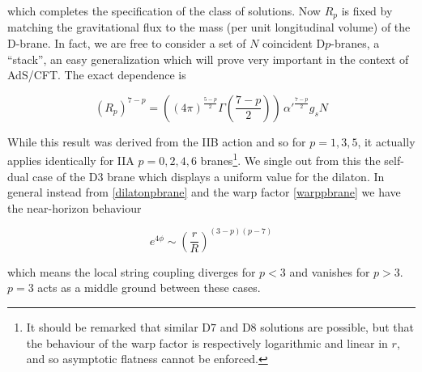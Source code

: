 which completes the specification of the class of solutions. Now $R_p$ is fixed by matching the gravitational flux to the mass (per unit longitudinal volume) of the D-brane. In fact, we are free to consider a set of $N$ coincident D$p$-branes, a ``stack'', an easy generalization which will prove very important in the context of AdS/CFT. The exact dependence is

\begin{equation}
	(R_p)^{7-p} =\left( (4\pi)^{\frac{5-p}{2}} \Gamma\left(\frac{7-p}{2}\right) \right) \, \alpha'^{\frac{7-p}{2}} g_s N
	\label{}
\end{equation}

While this result was derived from the IIB action and so for $p=1,3,5$, it actually applies identically for IIA $p=0,2,4,6$ branes\footnote{It should be remarked that similar D$7$ and D$8$ solutions are possible, but that the behaviour of the warp factor is respectively logarithmic and linear in $r$, and so asymptotic flatness cannot be enforced.}. We single out from this the self-dual case of the D$3$ brane which displays a uniform value for the dilaton. In general instead from \eqref{dilatonpbrane} and the warp factor \eqref{warppbrane} we have the near-horizon behaviour

\begin{equation}
	e^{4\phi} \sim \left( \frac{r}{R} \right)^{(3-p)(p-7)}
	\label{}
\end{equation}

which means the local string coupling diverges for $p<3$ and vanishes for $p>3$. $p=3$ acts as a middle ground between these cases.
